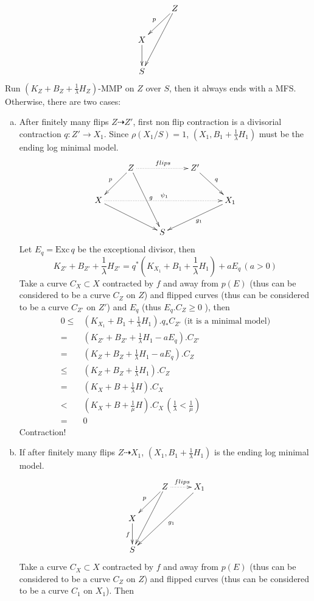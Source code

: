 \documentclass{article}
\begin{document}
\begin{enumerate}[(A)]
	$$ \xymatrix{
		&Z\ar[ld]_p\ar[ldd]\\
		X\ar[d]&\\
		S} $$
	Run $ (K_Z+B_Z+\frac{1}{\lambda}H_Z) $-MMP on $ Z $ over $ S $, then it always ends with a MFS. Otherwise, there are two cases:
	\begin{enumerate}[a)]
		\item After finitely many flips $ Z\dashrightarrow Z' $, first non flip contraction is a divisorial contraction $ q:Z'\to X_1 $. Since $ \rho(X_1/S)=1 $, $ (X_1,B_1+\frac{1}{\lambda}H_1) $ must be the ending log minimal model.
		$$ \xymatrix{
			&Z\ar[ld]_p\ar[rdd]^{g}\ar@{.>}[rr]^{flips}&&Z'\ar[dr]^{q}&\\
			X\ar[drr]\ar@{.>}[rrrr]^{\psi_1}&&&&X_1\ar[dll]^{g_1}\\
			&&S&&} $$
		Let $ E_q=\mathrm{Exc}\,q $ be the exceptional divisor, then 
		$$ K_{Z'}+B_{Z'}+\frac{1}{\lambda}H_{Z'}=q^*(K_{X_1}+B_1+\frac{1}{\lambda}H_1)+aE_q \,(a>0)$$
		Take a curve $ C_X\subset X $ contracted by $ f $ and away from $ p(E) $ (thus can be considered to be a curve $ C_Z $ on $ Z $) and flipped curves (thus can be considered to be a curve $ C_{Z'} $ on $ Z' $) and $ E_q $ (thus $ E_q.C_Z\geqslant 0 $ ), then
		\begin{equation*}
			\begin{aligned}
				0\leqslant& (K_{X_1}+B_1+\frac{1}{\lambda}H_1).q_*C_{Z'} \text{ (it is a minimal model)}\\
				=&(K_{Z'}+B_{Z'}+\frac{1}{\lambda}H_1-aE_q).C_{Z'}\\
				=&(K_{Z}+B_{Z}+\frac{1}{\lambda}H_1-aE_q).C_{Z}\\
				\leqslant &(K_{Z}+B_{Z}+\frac{1}{\lambda}H_1).C_{Z}\\
				=&(K_X+B+\frac{1}{\lambda}H).C_X\\
				<&(K_{X}+B+\frac{1}{\mu}H).C_X  \,(\frac{1}{\lambda}<\frac{1}{\mu})\\
				=&0
			\end{aligned}
		\end{equation*} 
		Contraction!
		\item If after finitely many flips $ Z\dashrightarrow X_1 $,  $ (X_1,B_1+\frac{1}{\lambda}H_1) $ is the ending log minimal model.
		$$ \xymatrix{
			&Z\ar[ld]_p\ar[ldd]\ar@{.>}[r]^{flips}&X_1\ar[lldd]^{g_1}\\
			X\ar[d]_f&&\\
			S &&}$$
		Take a curve $ C_X\subset X $ contracted by $ f $ and away from $ p(E) $ (thus can be considered to be a curve $ C_Z $ on $ Z $) and flipped curves (thus can be considered to be a curve $ C_{1} $ on $X_1$). Then

\end{enumerate}
\end{enumerate}
\end{document}
